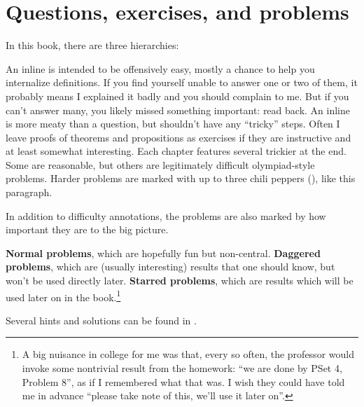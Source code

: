 

\eject

\section{Questions, exercises, and problems}
In this book, there are three hierarchies:
\begin{itemize}
	\ii An inline  is intended to be offensively easy,
	mostly a chance to help you internalize definitions.
	If you find yourself unable to answer one or two of them,
	it probably means I explained it badly and you should complain to me.
	But if you can't answer many,
	you likely missed something important: read back.
	\ii An inline  is more meaty than a question,
	but shouldn't have any ``tricky'' steps.
	Often I leave proofs of theorems and propositions as exercises
	if they are instructive and at least somewhat interesting.
	\ii Each chapter features several trickier  at the end.
	Some are reasonable, but others are legitimately
	difficult olympiad-style problems.
	\gim Harder problems are marked with up to
	three chili peppers (\scalebox{0.7}{\chili}), like this paragraph.

	In addition to difficulty annotations,
	the problems are also marked by how important they are to the big picture.
	\begin{itemize}
		\ii \textbf{Normal problems},
		which are hopefully fun but non-central.
		\ii \textbf{Daggered problems},
		which are (usually interesting) results that one should know,
		but won't be used directly later.
		\ii \textbf{Starred problems},
		which are results which will be used later on in the book.\footnote{%
			A big nuisance in college for me was that,
			every so often, the professor
			would invoke some nontrivial result from the homework:
			``we are done by PSet 4, Problem 8'',
			as if I remembered what that was.
			I wish they could have told me in advance
			``please take note of this, we'll use it later on''.
		}
	\end{itemize}
\end{itemize}
Several hints and solutions can be found in .


